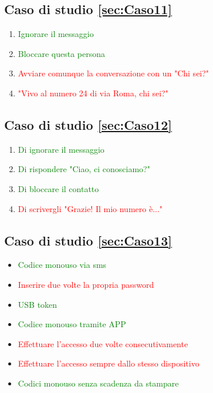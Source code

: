 \documentclass{article}
\begin{document}
\subsection{Caso di studio \ref{sec:Caso11}}
\begin{enumerate}
	\item \textcolor{green}{Ignorare il messaggio}
	\item \textcolor{green}{Bloccare questa persona}
	\item \textcolor{red}{Avviare comunque la conversazione con un "Chi sei?"}
	\item \textcolor{red}{"Vivo al numero 24 di via Roma, chi sei?"}
\end{enumerate}
\subsection{Caso di studio \ref{sec:Caso12}}
\begin{enumerate}
	\item \textcolor{green}{Di ignorare il messaggio}
	\item \textcolor{green}{Di rispondere "Ciao, ci conosciamo?"}
	\item \textcolor{green}{Di bloccare il contatto}
	\item \textcolor{red}{Di scrivergli "Grazie! Il mio numero è..."}
\end{enumerate}
\subsection{Caso di studio \ref{sec:Caso13}}
\begin{itemize}
	\item \textcolor{green}{Codice monouso via sms}
	\item \textcolor{red}{Inserire due volte la propria password}
	\item \textcolor{green}{USB token}
	\item \textcolor{green}{Codice monouso tramite APP}
	\item \textcolor{red}{Effettuare l'accesso due volte consecutivamente}
	\item \textcolor{red}{Effettuare l'accesso sempre dallo stesso dispositivo}
	\item \textcolor{green}{Codici monouso senza scadenza da stampare}
\end{itemize}
\end{document}
